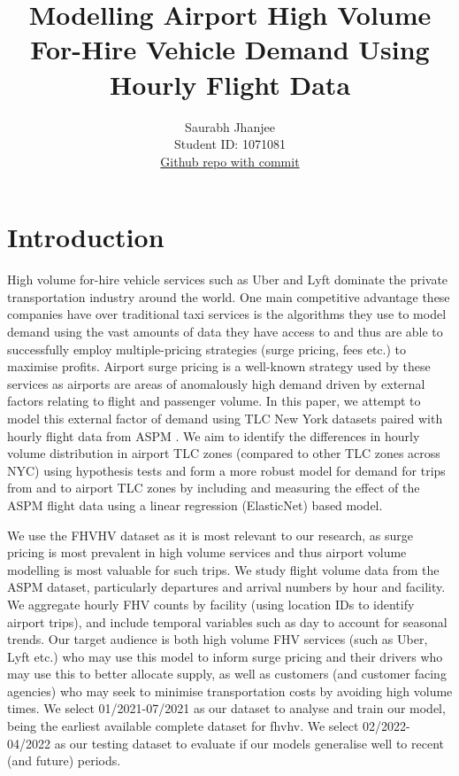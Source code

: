 \documentclass[11pt]{article}
\title{\textbf{Modelling Airport High Volume For-Hire Vehicle Demand Using Hourly Flight Data}}
\author{
Saurabh Jhanjee \\
Student ID: 1071081 \\
\href{https://github.com/MAST30034-Applied-Data-Science/mast30034-project-1-Shrub24/commit/03eb9c8c98d67463c8eef1748ecac35c523aac81}{Github repo with commit}
}
\begin{document}
\maketitle

\section{Introduction}

High volume for-hire vehicle services such as Uber and Lyft dominate the private transportation industry around the world. One main competitive advantage these companies have over traditional taxi services is the algorithms they use to model demand using the vast amounts of data they have access to and thus are able to successfully employ multiple-pricing strategies (surge pricing, fees etc.) to maximise profits. Airport surge pricing is a well-known strategy used by these services as airports are areas of anomalously high demand driven by external factors relating to flight and passenger volume. In this paper, we attempt to model this external factor of demand using TLC New York datasets \cite{thebigtaxidataset} paired with hourly flight data from ASPM \cite{2021aspmflightdata}. We aim to identify the differences in hourly volume distribution in airport TLC zones (compared to other TLC zones across NYC) using hypothesis tests and form a more robust model for demand for trips from and to airport TLC zones by including and measuring the effect of the ASPM flight data using a linear regression (ElasticNet) based model.

We use the FHVHV dataset as it is most relevant to our research, as surge pricing is most prevalent in high volume services and thus airport volume modelling is most valuable for such trips. We study flight volume data from the ASPM dataset, particularly departures and arrival numbers by hour and facility. We aggregate hourly FHV counts by facility (using location IDs to identify airport trips), and include temporal variables such as day to account for seasonal trends. Our target audience is both high volume FHV services (such as Uber, Lyft etc.) who may use this model to inform surge pricing and their drivers who may use this to better allocate supply, as well as customers (and customer facing agencies) who may seek to minimise transportation costs by avoiding high volume times. We select 01/2021-07/2021 as our dataset to analyse and train our model, being the earliest available complete dataset for fhvhv. We select 02/2022-04/2022 as our testing dataset to evaluate if our models generalise well to recent (and future) periods.
\end{document}
